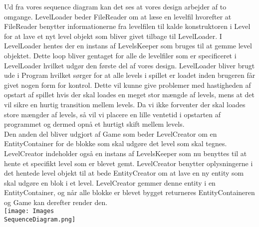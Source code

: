 Ud fra vores sequence diagram kan det ses at vores design arbejder af to omgange. LevelLoader beder FileReader om at læse en levelfil hvorefter at FileReader benytter informationerne fra levelfilen til kalde konstruktoren i Level for at lave et nyt level objekt som bliver givet tilbage til LevelLoader. I LevelLoader hentes der en instans af LevelsKeeper som bruges til at gemme level objektet. Dette loop bliver gentaget for alle de levelfiler som er specificeret i LevelLoader hvilket udgør den første del af vores design. LevelLoader bliver brugt ude i Program hvilket sørger for at alle levels i spillet er loadet inden brugeren får givet nogen form for kontrol. Dette vil kunne give problemer med hastigheden af opstart af spillet hvis der skal loades en meget stor mængde af levels, mens at det vil sikre en hurtig transition mellem levels. Da vi ikke forventer der skal loades store mængder af levels, så vil vi placere en lille ventetid i opstarten af programmet og dermed opnå et hurtigt skift mellem levels. \\
Den anden del bliver udgjort af Game som beder LevelCreator om en EntityContainer for de blokke som skal udgøre det level som skal tegnes. LevelCreator indeholder også en instans af LevelsKeeper som nu benyttes til at hente et specifikt level som er blevet gemt. LevelCreator benytter oplysningerne i det hentede level objekt til at bede EntityCreator om at lave en ny entity som skal udgøre en blok i et level. LevelCreator gemmer denne entity i en EntityContainer, og når alle blokke er blevet bygget returneres EntityContaineren og Game kan derefter render den.\\

\texttt{[image: Images\\SequenceDiagram.png]}

